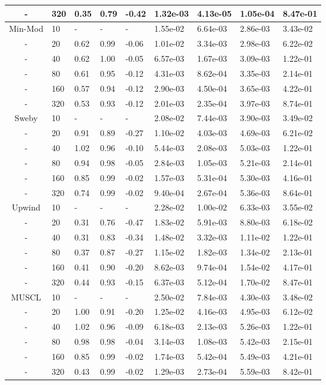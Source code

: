 \begin{table}[p]
{\begin{tabular}{cllllllll}
    - &  320 & 0.35 & 0.79 & -0.42 & 1.32e-03 & 4.13e-05 & 1.05e-04 & 8.47e-01 \\  
   \hline
    Min-Mod &   10 & - & - & - & 1.55e-02 & 6.64e-03 & 2.86e-03 & 3.43e-02  \\ 
    - &   20 & 0.62 & 0.99 & -0.06 & 1.01e-02 & 3.34e-03 & 2.98e-03 & 6.22e-02 \\  
    - &   40 & 0.62 & 1.00 & -0.05 & 6.57e-03 & 1.67e-03 & 3.09e-03 & 1.22e-01 \\  
    - &   80 & 0.61 & 0.95 & -0.12 & 4.31e-03 & 8.62e-04 & 3.35e-03 & 2.14e-01 \\  
    - &  160 & 0.57 & 0.94 & -0.12 & 2.90e-03 & 4.50e-04 & 3.65e-03 & 4.22e-01 \\  
    - &  320 & 0.53 & 0.93 & -0.12 & 2.01e-03 & 2.35e-04 & 3.97e-03 & 8.74e-01 \\  
   \hline
    Sweby &   10 & - & - & - & 2.08e-02 & 7.44e-03 & 3.90e-03 & 3.49e-02  \\ 
    - &   20 & 0.91 & 0.89 & -0.27 & 1.10e-02 & 4.03e-03 & 4.69e-03 & 6.21e-02 \\  
    - &   40 & 1.02 & 0.96 & -0.10 & 5.44e-03 & 2.08e-03 & 5.03e-03 & 1.22e-01 \\  
    - &   80 & 0.94 & 0.98 & -0.05 & 2.84e-03 & 1.05e-03 & 5.21e-03 & 2.14e-01 \\  
    - &  160 & 0.85 & 0.99 & -0.02 & 1.57e-03 & 5.31e-04 & 5.30e-03 & 4.16e-01 \\  
    - &  320 & 0.74 & 0.99 & -0.02 & 9.40e-04 & 2.67e-04 & 5.36e-03 & 8.64e-01 \\  
   \hline
    Upwind &   10 & - & - & - & 2.28e-02 & 1.00e-02 & 6.33e-03 & 3.55e-02  \\ 
    - &   20 & 0.31 & 0.76 & -0.47 & 1.83e-02 & 5.91e-03 & 8.80e-03 & 6.18e-02 \\  
    - &   40 & 0.31 & 0.83 & -0.34 & 1.48e-02 & 3.32e-03 & 1.11e-02 & 1.22e-01 \\  
    - &   80 & 0.37 & 0.87 & -0.27 & 1.15e-02 & 1.82e-03 & 1.34e-02 & 2.13e-01 \\  
    - &  160 & 0.41 & 0.90 & -0.20 & 8.62e-03 & 9.74e-04 & 1.54e-02 & 4.17e-01 \\  
    - &  320 & 0.44 & 0.93 & -0.15 & 6.37e-03 & 5.12e-04 & 1.70e-02 & 8.47e-01 \\  
   \hline
    MUSCL &   10 & - & - & - & 2.50e-02 & 7.84e-03 & 4.30e-03 & 3.48e-02  \\ 
    - &   20 & 1.00 & 0.91 & -0.20 & 1.25e-02 & 4.16e-03 & 4.95e-03 & 6.12e-02 \\  
    - &   40 & 1.02 & 0.96 & -0.09 & 6.18e-03 & 2.13e-03 & 5.26e-03 & 1.22e-01 \\  
    - &   80 & 0.98 & 0.98 & -0.04 & 3.14e-03 & 1.08e-03 & 5.42e-03 & 2.15e-01 \\  
    - &  160 & 0.85 & 0.99 & -0.02 & 1.74e-03 & 5.42e-04 & 5.49e-03 & 4.21e-01 \\  
    - &  320 & 0.43 & 0.99 & -0.02 & 1.29e-03 & 2.73e-04 & 5.59e-03 & 8.42e-01 \\ 
   \hline
   \end{tabular}
   }
\end{table}

